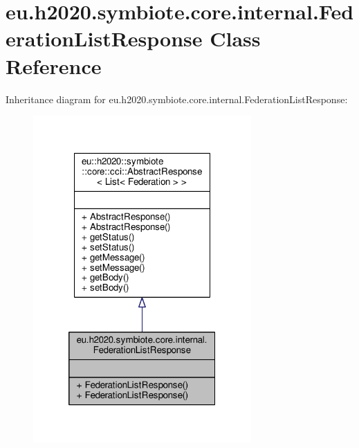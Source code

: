 \hypertarget{classeu_1_1h2020_1_1symbiote_1_1core_1_1internal_1_1FederationListResponse}{}\section{eu.\+h2020.\+symbiote.\+core.\+internal.\+Federation\+List\+Response Class Reference}
\label{classeu_1_1h2020_1_1symbiote_1_1core_1_1internal_1_1FederationListResponse}


Inheritance diagram for eu.\+h2020.\+symbiote.\+core.\+internal.\+Federation\+List\+Response\+:\nopagebreak
\begin{figure}[H]
\begin{center}
\leavevmode
\includegraphics[width=236pt]{classeu_1_1h2020_1_1symbiote_1_1core_1_1internal_1_1FederationListResponse__inherit__graph}
\end{center}
\end{figure}


